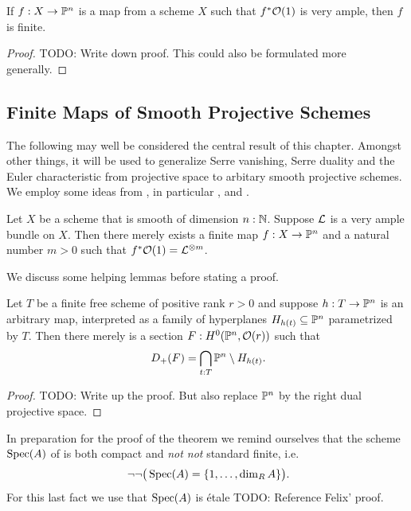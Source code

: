 \begin{lemma}
  \label{criterion-finiteness-via-ample}
  If $f : X \to \mathbb{P}^n$ is a map from a scheme $X$ such that $f^\ast\mathcal{O}(1)$ is very ample, then $f$ is finite.
\end{lemma}

\begin{proof}
  {\color{red}TODO: Write down proof. This could also be formulated more generally.}
\end{proof}






\subsection{Finite Maps of Smooth Projective Schemes}


The following may well be considered the central result of this chapter.
Amongst other things, it will be used to generalize Serre vanishing, Serre duality and the Euler characteristic from projective space to arbitary smooth projective schemes.
We employ some ideas from \cite{chinburg-finite-maps}, in particular \cite[Proposition 3.2.1]{chinburg-finite-maps}, and \cite{Gabber_2015}.

\begin{theorem}
  \label{merely-finite-map}
  Let $X$ be a scheme that is smooth of dimension $n:\mathbb N$.
  Suppose $\mathcal{L}$ is a very ample bundle on $X$.
  Then there merely exists a finite map $f : X \to \mathbb{P}^n$ and a natural number $m > 0$ such that $f^\ast\mathcal{O}(1) = \mathcal{L}^{\otimes m}$.
\end{theorem}

We discuss some helping lemmas before stating a proof.

\begin{lemma}
  \label{norm-of-etale-hyperplane-family}
  Let $T$ be a finite free scheme of positive rank $r > 0$ and suppose $h : T \to \mathbb{P}^n$ is an arbitrary map, interpreted as a family of hyperplanes $H_{h(t)} \subseteq \mathbb{P}^n$ parametrized by $T$.
  Then there merely is a section $F : H^0(\mathbb{P}^n, \mathcal{O}(r))$ such that
  \[
    D_+(F) = \bigcap_{t:T} \bP^n \setminus H_{h(t)} \rlap{.}
  \]
\end{lemma}

\begin{proof}
  {\color{red}TODO: Write up the proof. But also replace $\mathbb{P}^n$ by the right dual projective space.}
\end{proof}

\begin{remark}
  In preparation for the proof of the theorem we remind ourselves that the scheme $\operatorname{Spec}(A)$ of  is both compact and \emph{not not} standard finite, i.e.\
  \[
    \neg\neg \big(\Spec(A) = \{ 1, \hdots, \dim_R A \} \big) \rlap{.}
  \]
  For this last fact we use that $\operatorname{Spec}(A)$ is étale {\color{red}TODO: Reference Felix' proof}.
\end{remark}

